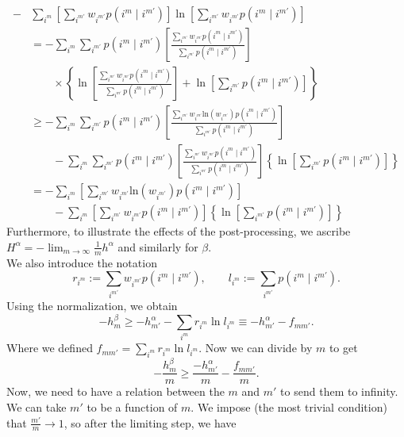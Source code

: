 \documentclass{article}
\begin{document}
\begin{align*}
-&\sum_{i^m}
\left[
\sum_{i^{m'}}w_{i^{m'}}p(i^m\mid i^{m'})
\right]
\ln\left[
\sum_{i^{m'}}w_{i^{m'}}p(i^m\mid i^{m'})
\right]
\\
&=
-\sum_{i^m}\sum_{i^{m'}}p(i^m\mid i^{m'})
\left[
\frac{
\sum_{i^{m'}}w_{i^{m'}}p(i^m\mid i^{m'})
}{
\sum_{i^{m'}}p(i^m\mid i^{m'})
}
\right]
\nonumber\\
&\qquad\times
\left\{
\ln\left[
\frac{
\sum_{i^{m'}}w_{i^{m'}}p(i^m\mid i^{m'})
}{
\sum_{i^{m'}}p(i^m\mid i^{m'})
}
\right]+\ln\left[\sum_{i^{m'}}p(i^m\mid i^{m'})\right]\right\}\\
&\geq
-\sum_{i^m}\sum_{i^{m'}}p(i^m\mid i^{m'})
\left[
\frac{
\sum_{i^{m'}}w_{i^{m'}}\text{ln}(w_{i^{m'}}) p(i^m\mid i^{m'})
}{
\sum_{i^{m'}}p(i^m\mid i^{m'})
}
\right]
\nonumber\\
&\qquad
 -\sum_{i^m}\sum_{i^{m'}}p(i^m\mid i^{m'})
\left[
\frac{
\sum_{i^{m'}}w_{i^{m'}}p(i^m\mid i^{m'})
}{
\sum_{i^{m'}}p(i^m\mid i^{m'})
}
\right]
\nonumber
\left\{\ln\left[\sum_{i^{m'}}p(i^m\mid i^{m'})\right]\right\} \\
&=
-\sum_{i^m}
\left[
\sum_{i^{m'}}w_{i^{m'}}\text{ln}(w_{i^{m'}}) p(i^m\mid i^{m'})
\right]
\nonumber\\
&\qquad
 -\sum_{i^m}
\left[
\sum_{i^{m'}}w_{i^{m'}}p(i^m\mid i^{m'})
\right]
\nonumber
\left\{\ln\left[\sum_{i^{m'}}p(i^m\mid i^{m'})\right]\right\}
\end{align*}
Furthermore, to illustrate the effects of the post-processing, we ascribe $H^\alpha = -\lim_{m\to\infty}\frac{1}{m}h^\alpha$ and similarly for $\beta$.\\
We also introduce the notation
\begin{equation}
r_{i^m}
:=
\sum_{i^{m'}}w_{i^{m'}}p(i^m\mid i^{m'}),
\qquad
l_{i^m}
:=
\sum_{i^{m'}}p(i^m\mid i^{m'}).
\end{equation}
Using the normalization, we obtain
\begin{equation}
-h^\beta_m
\geq
-h^\alpha_{m'}
-
\sum_{i^m}r_{i^m}\ln l_{i^m} \equiv-h^\alpha_{m'}
-f_{mm'}.
\end{equation}
Where we defined $f_{mm'} = \sum_{i^m}r_{i^m}\ln l_{i^m}$. Now we can divide by $m$ to get
\begin{equation}
-\frac{h^\beta_m}{m}
\geq 
\frac{-h^\alpha_{m'}}{m}
-\frac{f_{mm'}}{m}.
\end{equation}
Now, we need to have a relation between the $m$ and $m'$ to send them to infinity. We can take $m'$ to be a function of $m$. We impose (the most trivial condition) that $\frac{m'}{m} \to 1$, so after the limiting step, we have  
\end{document}
